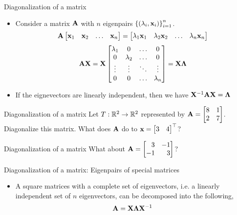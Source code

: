 \documentclass[aspectratio=169]{beamer}
\let\olditem\item
\renewcommand{\item}{\setlength{\itemsep}{\fill}\olditem}
\def\mf{\ensuremath\mathbf}
\def\mb{\ensuremath\mathbb}
\def\bmx{\ensuremath\begin{bmatrix*}[r]}
\def\emx{\ensuremath\end{bmatrix*}}
\begin{document}
\begin{frame}[t]{Diagonalization of a matrix}
\begin{itemize}
    \item Consider a matrix $\mf{A}$ with $n$ eigenpairs $\left\{\left(\lambda_i, \mf{x}_i\right)\right\}_{i=1}^n$.
    \[ \mf{A}\begin{bmatrix*}\mf{x}_1 & \mf{x}_2 & \ldots & \mf{x}_n\end{bmatrix*} = \begin{bmatrix*}\lambda_1\mf{x}_1 & \lambda_2\mf{x}_2 & \ldots & \lambda_n\mf{x}_n\end{bmatrix*} \]
    \[ \mf{AX} = \mf{X}\begin{bmatrix*}\lambda_1 & 0 & \ldots & 0\\0 & \lambda_2 & \ldots & 0\\\vdots & \vdots & \ddots & \vdots\\0 & 0 & \ldots & \lambda_n\end{bmatrix*} = \mf{X}\mf{\Lambda} \]

    \item If the eignevectors are linearly independent, then we have $\mf{X}^{-1}\mf{A}\mf{X} = \mf{\Lambda}$
\end{itemize}
\end{frame}


\begin{frame}[t]{Diagonalization of a matrix}
Let $T: \mb{R}^2 \to \mb{R}^2$ represented by $\mf{A} = \bmx 8 & 1\\2 & 7\emx$. Diagonalize this matrix. What does $\mf{A}$ do to $\mf{x} = \bmx 3 & 4\emx^\top$?
\end{frame}


\begin{frame}[t]{Diagonalization of a matrix}
What about $\mf{A} = \bmx 3 & -1\\-1 & 3\emx$?
\end{frame}


\begin{frame}[t]{Diagonalization of a matrix: Eigenpairs of special matrices}
\begin{itemize}
    \item A square matrices with a complete set of eigenvectors, i.e. a linearly independent set of $n$ eigenvectors, can be decomposed into the following,
    \[ \mf{A} = \mf{X}\mf{\Lambda}\mf{X}^{-1} \]
\end{itemize}
\end{frame}
\end{document}
